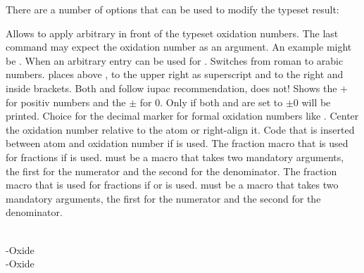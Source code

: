 \documentclass{chemmacros-manual}
\begin{document}
There are a number of options that can be used to modify the typeset result:
\begin{options}
    Allows to apply arbitrary  in front of the
    typeset oxidation numbers.  The last command may expect the oxidation
    number as an argument.  An example might be .
    When  an arbitrary entry can be used for .
    Switches from roman to arabic numbers.
     places  above ,  to the
    upper right as superscript and  to the right and inside
    brackets.  Both  and  follow \ac{iupac}
    recommendation,  does not!
    Shows the $+$ for positiv numbers and the $\pm$ for $0$.
    Only if both  and
     are set to  $\pm0$ will be
    printed.
    Choice for the decimal marker for formal oxidation numbers like .
    Center the oxidation number relative to the atom or right-align it.
  \Default{\cs*{,}}
    Code that is inserted between atom and oxidation number if
     is used.
    The fraction macro that is used for fractions if  is
    used.   must be a macro that takes two mandatory arguments, the
    first for the numerator and the second for the denominator.
    The fraction macro that is used for fractions if  or
     is used.   must be a macro that takes two
    mandatory arguments, the first for the numerator and the second for the
    denominator.
\end{options}

\begin{example}
    \\
  -Oxide \\
  -Oxide \\
   \\
\end{example}
\end{document}
